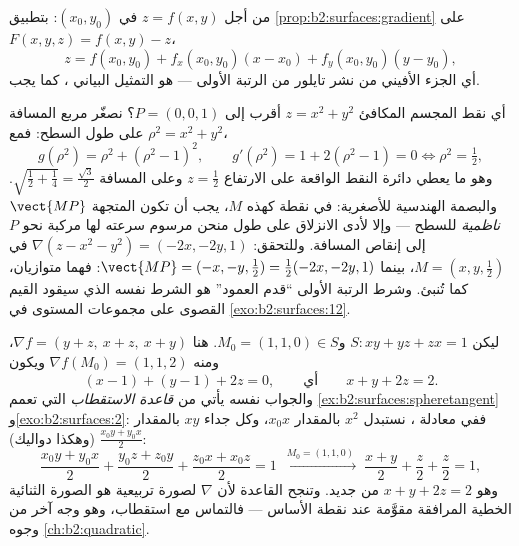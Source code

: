 \begin{example}\label{ex:b2:surfaces:graphtangent}
من أجل $z = f(x, y)$ في $(x_0, y_0)$: بتطبيق \cref{prop:b2:surfaces:gradient} على $F(x,y,z) = f(x,y) - z$،
\[
z = f(x_0, y_0)
+ f_x(x_0, y_0)(x - x_0)
+ f_y(x_0, y_0)(y - y_0) ,
\]
أي الجزء الأفيني من نشر تايلور من الرتبة الأولى --- 
هو التمثيل البياني ، كما يجب.
\end{example}

\begin{example}\label{ex:b2:surfaces:closest}
أي نقط المجسم المكافئ $z = x^2 + y^2$ أقرب إلى $P = (0, 0, 1)$؟ نصغّر مربع المسافة
على طول السطح: فمع $\rho^2 = x^2 + y^2$،
\[
g(\rho^2) = \rho^2 + (\rho^2 - 1)^2,
\qquad
g'(\rho^2) = 1 + 2(\rho^2 - 1) = 0
\iff \rho^2 = \tfrac12 ,
\]
وهو ما يعطي دائرة النقط الواقعة على الارتفاع $z = \frac12$ وعلى المسافة
$\sqrt{\tfrac12 + \tfrac14} = \frac{\sqrt3}2$. والبصمة الهندسية للأصغرية: في نقطة كهذه $M$، يجب أن تكون
المتجهة $\vect{MP}$ \emph{ناظمية} للسطح --- وإلا لأدى الانزلاق على طول
منحن مرسوم سرعته لها مركبة نحو $P$ إلى إنقاص المسافة. وللتحقق:
$\nabla(z - x^2 - y^2) = (-2x, -2y, 1)$ في $M = (x, y,
\tfrac12)$، بينما $\vect{MP} = (-x, -y, \tfrac12) =
\tfrac12(-2x, -2y, 1)$: فهما متوازيان، كما تُنبئ. وشرط
الرتبة الأولى ``قدم العمود'' هو الشرط نفسه الذي سيقود القيم القصوى
على مجموعات المستوى في \cref{exo:b2:surfaces:12}.
\end{example}

\begin{example}\label{ex:b2:surfaces:polarization}
ليكن $S : xy + yz + zx = 1$ و$M_0 = (1, 1, 0) \in S$. هنا $\nabla f = (y + z,\ x + z,\ x + y)$، ومنه $\nabla f(M_0) = (1,
1, 2)$ ويكون 
\[
(x - 1) + (y - 1) + 2z = 0,
\qquad\text{أي}\qquad x + y + 2z = 2 .
\]
والجواب نفسه يأتي من \emph{قاعدة الاستقطاب} التي تعمم \cref{ex:b2:surfaces:spheretangent}
و\cref{exo:b2:surfaces:2}: ففي معادلة ، نستبدل $x^2$
بالمقدار $x_0x$، وكل جداء $xy$ بالمقدار $\frac{x_0y +
y_0x}2$ (وهكذا دواليك):
\[
\frac{x_0y + y_0x}2 + \frac{y_0z + z_0y}2 + \frac{z_0x +
x_0z}2 = 1
\;\xrightarrow{\ M_0 = (1,1,0)\ }\;
\frac{x + y}2 + \frac z2 + \frac z2 = 1 ,
\]
وهو $x + y + 2z = 2$ من جديد. وتنجح القاعدة لأن $\nabla$ لصورة تربيعية هو
الصورة الثنائية الخطية المرافقة مقوَّمة عند نقطة الأساس --- فالتماس
مع  استقطاب، وهو وجه آخر من وجوه \cref{ch:b2:quadratic}.
\end{example}

